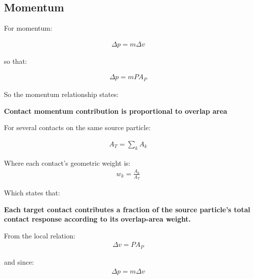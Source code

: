 \subsection{Momentum}

For momentum:

\begin{equation}
\begin{aligned}
\Delta p = m \Delta v
\end{aligned}
\end{equation}

so that:


\begin{equation}
\begin{aligned}
\Delta p = m P A_P
\end{aligned}
\end{equation}

So the momentum relationship states:

\textbf{Contact momentum contribution is proportional to overlap area}

For several contacts on the same source particle:

\begin{equation}
\begin{aligned}
A_T = \sum_k A_k
\end{aligned}
\end{equation}

Where each contact’s geometric weight is:
\begin{equation}
\begin{aligned}
w_k = \frac{A_k}{A_T}
\end{aligned}
\end{equation}

Which states that:

\textbf{Each target contact contributes a fraction of the source particle's total contact response according to its overlap-area weight.}

From the local relation:
\begin{equation}
\begin{aligned}
\label{none}
\Delta v = P A_P
\end{aligned}
\end{equation}

and since:
\begin{equation}
\begin{aligned}
\label{none}
\Delta p = m \Delta v
\end{aligned}
\end{equation}

